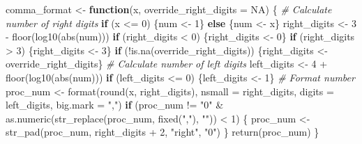 \documentclass[
]{book}
\newenvironment{Shaded}{\begin{snugshade}}{\end{snugshade}}
\newcommand{\AttributeTok}[1]{\textcolor[rgb]{0.77,0.63,0.00}{#1}}
\newcommand{\CommentTok}[1]{\textcolor[rgb]{0.56,0.35,0.01}{\textit{#1}}}
\newcommand{\ConstantTok}[1]{\textcolor[rgb]{0.00,0.00,0.00}{#1}}
\newcommand{\ControlFlowTok}[1]{\textcolor[rgb]{0.13,0.29,0.53}{\textbf{#1}}}
\newcommand{\DecValTok}[1]{\textcolor[rgb]{0.00,0.00,0.81}{#1}}
\newcommand{\FunctionTok}[1]{\textcolor[rgb]{0.00,0.00,0.00}{#1}}
\newcommand{\NormalTok}[1]{#1}
\newcommand{\OtherTok}[1]{\textcolor[rgb]{0.56,0.35,0.01}{#1}}
\newcommand{\SpecialCharTok}[1]{\textcolor[rgb]{0.00,0.00,0.00}{#1}}
\newcommand{\StringTok}[1]{\textcolor[rgb]{0.31,0.60,0.02}{#1}}
\begin{document}
\begin{Shaded}
\begin{Highlighting}[]
\NormalTok{comma\_format }\OtherTok{\textless{}{-}} \ControlFlowTok{function}\NormalTok{(x, }\AttributeTok{override\_right\_digits =} \ConstantTok{NA}\NormalTok{) \{}
  \CommentTok{\# Calculate number of right digits}
  \ControlFlowTok{if}\NormalTok{ (x }\SpecialCharTok{\textless{}=} \DecValTok{0}\NormalTok{) \{num }\OtherTok{\textless{}{-}} \DecValTok{1}\NormalTok{\} }\ControlFlowTok{else}\NormalTok{ \{num }\OtherTok{\textless{}{-}}\NormalTok{ x\}}
\NormalTok{  right\_digits }\OtherTok{\textless{}{-}} \DecValTok{3} \SpecialCharTok{{-}} \FunctionTok{floor}\NormalTok{(}\FunctionTok{log10}\NormalTok{(}\FunctionTok{abs}\NormalTok{(num)))}
  \ControlFlowTok{if}\NormalTok{ (right\_digits }\SpecialCharTok{\textless{}} \DecValTok{0}\NormalTok{) \{right\_digits }\OtherTok{\textless{}{-}} \DecValTok{0}\NormalTok{\}}
  \ControlFlowTok{if}\NormalTok{ (right\_digits }\SpecialCharTok{\textgreater{}} \DecValTok{3}\NormalTok{) \{right\_digits }\OtherTok{\textless{}{-}} \DecValTok{3}\NormalTok{\}}
  \ControlFlowTok{if}\NormalTok{ (}\SpecialCharTok{!}\FunctionTok{is.na}\NormalTok{(override\_right\_digits)) \{right\_digits }\OtherTok{\textless{}{-}}\NormalTok{ override\_right\_digits\}}
  \CommentTok{\# Calculate number of left digits}
\NormalTok{  left\_digits }\OtherTok{\textless{}{-}} \DecValTok{4} \SpecialCharTok{+} \FunctionTok{floor}\NormalTok{(}\FunctionTok{log10}\NormalTok{(}\FunctionTok{abs}\NormalTok{(num)))}
  \ControlFlowTok{if}\NormalTok{ (left\_digits }\SpecialCharTok{\textless{}=} \DecValTok{0}\NormalTok{) \{left\_digits }\OtherTok{\textless{}{-}} \DecValTok{1}\NormalTok{\}}
  \CommentTok{\# Format number}
\NormalTok{  proc\_num }\OtherTok{\textless{}{-}} \FunctionTok{format}\NormalTok{(}\FunctionTok{round}\NormalTok{(x, right\_digits), }\AttributeTok{nsmall =}\NormalTok{ right\_digits, }\AttributeTok{digits =}\NormalTok{  left\_digits, }\AttributeTok{big.mark =} \StringTok{","}\NormalTok{)}
  \ControlFlowTok{if}\NormalTok{ (proc\_num }\SpecialCharTok{!=} \StringTok{"0"} \SpecialCharTok{\&} \FunctionTok{as.numeric}\NormalTok{(}\FunctionTok{str\_replace}\NormalTok{(proc\_num, }\FunctionTok{fixed}\NormalTok{(}\StringTok{","}\NormalTok{), }\StringTok{""}\NormalTok{)) }\SpecialCharTok{\textless{}} \DecValTok{1}\NormalTok{) \{}
\NormalTok{    proc\_num }\OtherTok{\textless{}{-}} \FunctionTok{str\_pad}\NormalTok{(proc\_num, right\_digits }\SpecialCharTok{+} \DecValTok{2}\NormalTok{, }\StringTok{"right"}\NormalTok{, }\StringTok{"0"}\NormalTok{)}
\NormalTok{  \}}
  \FunctionTok{return}\NormalTok{(proc\_num)}
\NormalTok{\}}
\end{Highlighting}
\end{Shaded}
\end{document}
